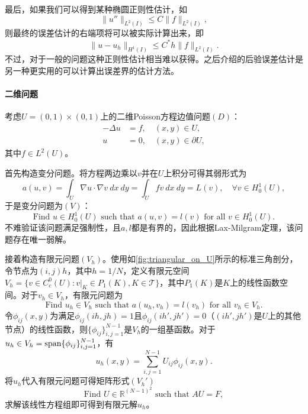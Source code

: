 \documentclass[a4paper,10pt]{ctexart}
\begin{document}
最后，如果我们可以得到某种椭圆正则性估计，如
\begin{equation}
    \| u'' \|_{L^2(I)} \leqslant C\| f \|_{L^2(I)},
\end{equation}
则最终的误差估计的右端项将可以被实际计算出来，即
\begin{equation}
    \| u - u_h \|_{H^1(I)} \leqslant C^*h\| f \|_{L^2(I)}.
\end{equation}
不过，对于一般的问题这种正则性估计相当难以获得。之后介绍的后验误差估计是另一种更实用的可以计算出误差界的估计方法。

\paragraph*{二维问题}
考虑$ U = (0,1)\times (0,1) $上的二维Poisson方程边值问题$ (D) $：
\[
    \begin{aligned}
        -\Delta u &= f,\quad (x,y)\in U,\\
        u &= 0,\quad (x,y)\in \partial U,
    \end{aligned}
\]
其中$ f\in L^2(U) $。

首先构造变分问题。将方程两边乘以$ v $并在$ U $上积分可得其弱形式为
\[
    a(u,v) = \int_U \nabla u\cdot \nabla v\ dx\ dy = \int_U fv\ dx\ dy = L(v),\quad \forall v\in H^1_0(U),
\]
于是变分问题为$ (V) $：
\[
    \text{Find } u\in H^1_0(U) \text{ such that } a(u,v) = l(v) \text{ for all } v\in H^1_0(U).
\]
不难验证该问题满足强制性，且$ a,l $都是有界的，因此根据Lax-Milgram定理，该问题存在唯一弱解。

接着构造有限元问题$ (V_h) $。使用如\ref{fig:triangular_on_U}所示的标准三角剖分，令节点为$ (i,j)h $，其中$ h = 1 / N $，定义有限元空间$ V_h = \{v\in C_c^0(U):v|_{K}\in P_1(K),K\in \mathcal{T}\} $，其中$ P_1(K) $是$ K $上的线性函数空间。对于$ v_h\in V_h $，有限元问题为
\[
    \text{Find } u_h\in V_h \text{ such that } a(u_h,v_h) = l(v_h) \text{ for all } v_h\in V_h.
\]
令$ \phi_{ij}(x,y) $为满足$ \phi_{ij}(ih,jh) = 1 $且$ \phi_{ij}(ih',jh') = 0 $（$ (ih',jh') $是$ U $上的其他节点）的线性函数，则$ \{\phi_{ij}\}_{i,j=1}^{N-1} $是$ V_h $的一组基函数。对于$ u_h\in V_h = {\rm span}\{\phi_{ij}\}_{i,j=1}^{N-1} $，有
\[
    u_h(x,y) = \sum_{i,j=1}^{N-1} U_{ij}\phi_{ij}(x,y).
\]
将$ u_h $代入有限元问题可得矩阵形式$ (V_h') $
\[
    \text{Find } U \in \mathbb{R}^{(N-1)^2} \text{ such that } AU = F,
\]
求解该线性方程组即可得到有限元解$ u_h $。
\end{document}
